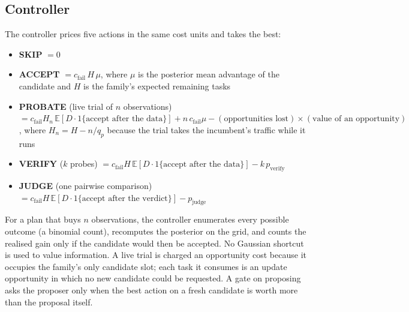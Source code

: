 \documentclass[11pt]{article}
\begin{document}
\subsection{Controller}
The controller prices five actions in the same cost units and takes the best:
\begin{itemize}
  \item \textbf{SKIP} $= 0$
  \item \textbf{ACCEPT} $= c_{\text{fail}}\, H\, \mu$, where $\mu$ is the posterior mean
    advantage of the candidate and $H$ is the family's expected remaining tasks
  \item \textbf{PROBATE} (live trial of $n$ observations)
    $= c_{\text{fail}} H_n\, \mathbb{E}[D \cdot 1\{\text{accept after the data}\}]
    + n\, c_{\text{fail}} \mu - (\text{opportunities lost}) \times (\text{value of an opportunity})$,
    where $H_n = H - n/q_p$ because the trial takes the incumbent's traffic while it runs
  \item \textbf{VERIFY} ($k$ probes)
    $= c_{\text{fail}} H\, \mathbb{E}[D \cdot 1\{\text{accept after the data}\}] - k\, p_{\text{verify}}$
  \item \textbf{JUDGE} (one pairwise comparison)
    $= c_{\text{fail}} H\, \mathbb{E}[D \cdot 1\{\text{accept after the verdict}\}] - p_{\text{judge}}$
\end{itemize}
For a plan that buys $n$ observations, the controller enumerates every possible outcome (a
binomial count), recomputes the posterior on the grid, and counts the realised gain only if
the candidate would then be accepted.  No Gaussian shortcut is used to value information.
A live trial is charged an opportunity cost because it occupies the family's only candidate
slot; each task it consumes is an update opportunity in which no new candidate could be
requested.  A gate on proposing asks the proposer only when the best action on a fresh
candidate is worth more than the proposal itself.
\end{document}
